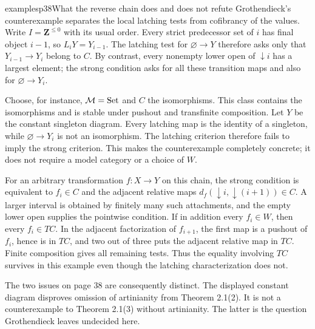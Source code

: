 \begin{dcomment}{examples}{p38}{What the reverse chain does and does not refute}
Grothendieck's counterexample separates the local latching tests from cofibrancy of the values. Write $I=\mathbf Z^{\leq0}$ with its usual order. Every strict predecessor set of $i$ has final object $i-1$, so $L_iY=Y_{i-1}$. The latching test for $\varnothing\to Y$ therefore asks only that $Y_{i-1}\to Y_i$ belong to $C$. By contrast, every nonempty lower open of $\downarrow i$ has a largest element; the strong condition asks for all these transition maps and also for $\varnothing\to Y_i$.

Choose, for instance, $\mathcal{M}=\mathrm{Set}$ and $C$ the isomorphisms. This class contains the isomorphisms and is stable under pushout and transfinite composition. Let $Y$ be the constant singleton diagram. Every latching map is the identity of a singleton, while $\varnothing\to Y_i$ is not an isomorphism. The latching criterion therefore fails to imply the strong criterion. This makes the counterexample completely concrete; it does not require a model category or a choice of $W$.

For an arbitrary transformation $f:X\to Y$ on this chain, the strong condition is equivalent to $f_i\in C$ and the adjacent relative maps $d_f(\downarrow i,\downarrow(i+1))\in C$. A larger interval is obtained by finitely many such attachments, and the empty lower open supplies the pointwise condition. If in addition every $f_i\in W$, then every $f_i\in TC$. In the adjacent factorization of $f_{i+1}$, the first map is a pushout of $f_i$, hence is in $TC$, and two out of three puts the adjacent relative map in $TC$. Finite composition gives all remaining tests. Thus the equality involving $TC$ survives in this example even though the latching characterization does not.

The two issues on page 38 are consequently distinct. The displayed constant diagram disproves omission of artinianity from Theorem 2.1(2). It is not a counterexample to Theorem 2.1(3) without artinianity. The latter is the question Grothendieck leaves undecided here.
\end{dcomment}


